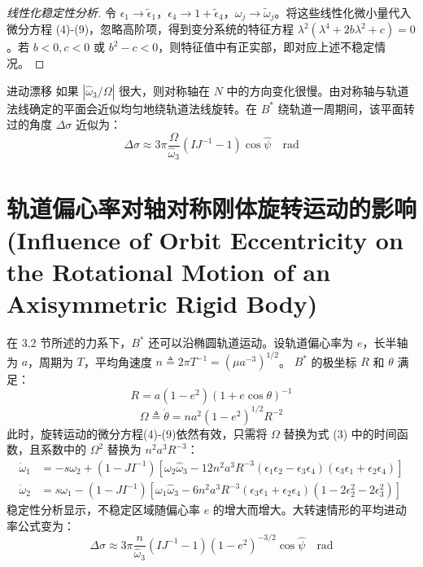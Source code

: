 \begin{proof}[线性化稳定性分析]
令 \(\epsilon_1 \to \tilde{\epsilon}_1\)，\(\epsilon_4 \to 1 + \tilde{\epsilon}_4\)，\(\omega_j \to \tilde{\omega}_j\)。将这些线性化微小量代入微分方程 (4)-(9)，忽略高阶项，得到变分系统的特征方程 \(\lambda^2(\lambda^4 + 2b\lambda^2 + c) = 0\)。若 \(b<0, c<0\) 或 \(b^2-c<0\)，则特征值中有正实部，即对应上述不稳定情况。
\end{proof}

\begin{myTheorem}{进动漂移}
如果 \(|\hat{\omega}_3/\Omega|\) 很大，则对称轴在 \(N\) 中的方向变化很慢。由对称轴与轨道法线确定的平面会近似均匀地绕轨道法线旋转。在 \(B^*\) 绕轨道一周期间，该平面转过的角度 \(\Delta\sigma\) 近似为：
\begin{equation}
\Delta\sigma \approx 3\pi \frac{\Omega}{\hat{\omega}_3}(IJ^{-1} - 1)\cos\hat{\psi} \quad \text{rad} \tag{22}
\end{equation}
\end{myTheorem}

\section{轨道偏心率对轴对称刚体旋转运动的影响 (Influence of Orbit Eccentricity on the Rotational Motion of an Axisymmetric Rigid Body)}

在 3.2 节所述的力系下，\(B^*\) 还可以沿椭圆轨道运动。设轨道偏心率为 \(e\)，长半轴为 \(a\)，周期为 \(T\)，平均角速度 \(n \triangleq 2\pi T^{-1} = (\mu a^{-3})^{1/2}\)。
\(B^*\) 的极坐标 \(R\) 和 \(\theta\) 满足：
\begin{equation}
R = a(1-e^2)(1+e\cos\theta)^{-1} \tag{2}
\end{equation}
\begin{equation}
\Omega \triangleq \dot{\theta} = n a^2(1-e^2)^{1/2}R^{-2} \tag{3}
\end{equation}
此时，旋转运动的微分方程(4)-(9)依然有效，只需将 \(\Omega\) 替换为式 (3) 中的时间函数，且系数中的 \(\Omega^2\) 替换为 \(n^2 a^3 R^{-3}\)：
\begin{align}
\dot{\omega}_1 &= -s\omega_2 + (1 - JI^{-1})[\omega_2\hat{\omega}_3 - 12n^2 a^3 R^{-3}(\epsilon_1\epsilon_2 - \epsilon_3\epsilon_4)(\epsilon_3\epsilon_1 + \epsilon_2\epsilon_4)] \tag{8} \\
\dot{\omega}_2 &= s\omega_1 - (1 - JI^{-1})[\omega_1\hat{\omega}_3 - 6n^2 a^3 R^{-3}(\epsilon_3\epsilon_1 + \epsilon_2\epsilon_4)(1 - 2\epsilon_2^2 - 2\epsilon_3^2)] \tag{9}
\end{align}
稳定性分析显示，不稳定区域随偏心率 \(e\) 的增大而增大。大转速情形的平均进动率公式变为：
\begin{equation}
\Delta\sigma \approx 3\pi \frac{n}{\hat{\omega}_3} (IJ^{-1} - 1)(1 - e^2)^{-3/2}\cos\hat{\psi} \quad \text{rad} \tag{12}
\end{equation}


